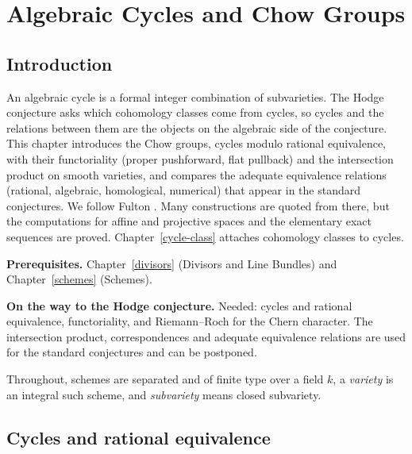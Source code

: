 \chapter{Algebraic Cycles and Chow Groups}\label{intersection-theory}

\section{Introduction}\label{intersection-theory:section-introduction}

An algebraic cycle is a formal integer combination of subvarieties. The Hodge conjecture asks which cohomology classes come from cycles, so cycles and the
relations between them are the objects on the algebraic side of the conjecture. This chapter introduces the Chow groups, cycles modulo rational
equivalence, with their functoriality (proper pushforward, flat pullback) and the intersection product on smooth varieties, and compares the adequate
equivalence relations (rational, algebraic, homological, numerical) that appear in the standard conjectures. We follow Fulton \cite{fulton-intersection}.
Many constructions are quoted from there, but the computations for affine and projective spaces and the elementary exact sequences are proved.
Chapter~\ref{cycle-class} attaches cohomology classes to cycles.

\noindent\textbf{Prerequisites.} Chapter~\ref{divisors} (Divisors and Line Bundles) and Chapter~\ref{schemes} (Schemes).

\noindent\textbf{On the way to the Hodge conjecture.} Needed: cycles and rational equivalence, functoriality, and Riemann--Roch for the Chern character. The intersection product, correspondences
and adequate equivalence relations are used for the standard conjectures and can be postponed.

Throughout, schemes are separated and of finite type over a field $k$, a \emph{variety} is an integral such scheme, and \emph{subvariety} means closed subvariety.

\section{Cycles and rational equivalence}\label{intersection-theory:section-chow-groups}


